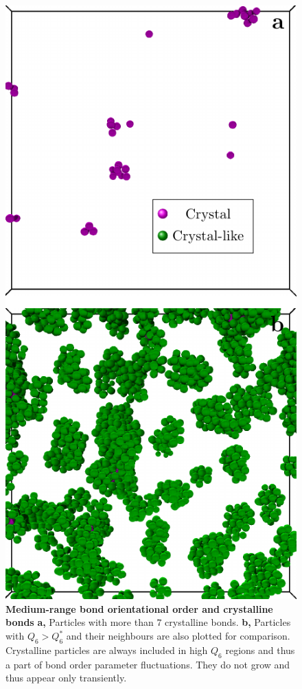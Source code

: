 \documentclass[prl,twocolumn,notitlepage]{revtex4-1}
\begin{document}
\begin{figure}
\begin{center}
\includegraphics{generate_figures-figure4.pdf}
\end{center}
\caption{\textbf{Medium-range bond orientational order and crystalline bonds} {\bf a,} Particles with more than $7$ crystalline bonds.  {\bf b,} Particles with $Q_6>Q_6^*$ and their neighbours are also plotted for comparison. Crystalline particles are always included in high $Q_6$ regions and thus a part of bond order parameter fluctuations. They do not grow and thus appear only transiently.}
	\label{fig:X_3D}
\end{figure}
\end{document}
